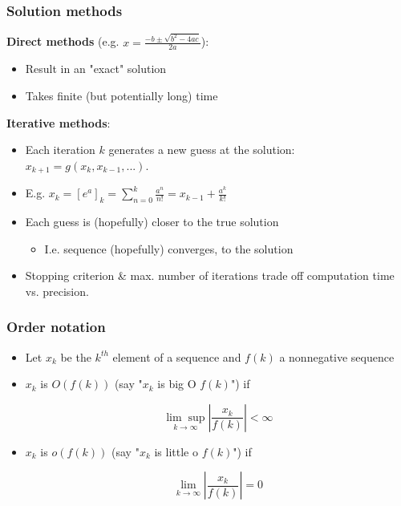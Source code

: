 \documentclass[bigger]{beamer}
\begin{document}
\begin{frame}%

\frametitle{Solution methods}

\textbf{Direct methods} (e.g. $x=\frac{-b\pm \sqrt{b^{2}-4ac}}{2a}$):

\begin{itemize}
\item Result in an "exact" solution

\item Takes finite (but potentially long) time
\end{itemize}

\textbf{Iterative methods}:

\begin{itemize}
\item Each iteration $k$ generates a new guess at the solution:\newline
$x_{k+1}=g\left( x_{k},x_{k-1},...\right) $.

\item E.g. $x_{k}=\left[ e^{a}\right] _{k}=\sum\nolimits_{n=0}^{k}\frac{a^{n}%
}{n!}=x_{k-1}+\frac{a^{k}}{k!}$

\item Each guess is (hopefully) closer to the true solution

\begin{itemize}
\item I.e. sequence (hopefully) converges, to the solution
\end{itemize}

\item Stopping criterion \& max. number of iterations trade off computation
time vs. precision.
\end{itemize}


\end{frame}%

\begin{frame}
\frametitle{Order notation}

\begin{itemize}

\item Let $x_k$ be the $k^{th}$ element of a sequence and $f(k)$ a nonnegative sequence 

\item $x_{k}$ is $O(f(k))$ (say "$x_k$ is big O $f(k)$") if

\begin{equation*}
\underset{k\to\infty}{\lim\sup} \left|\frac{x_{k}}{f(k)}\right|<\infty
\end{equation*}

\item $x_{k}$ is $o(f(k))$ (say "$x_k$ is little o $f(k)$") if

\begin{equation*}
\underset{k\to\infty}{\lim}\left|\frac{x_{k}}{f(k)}\right|= 0 
\end{equation*}


\end{itemize}

\end{frame}
\end{document}
